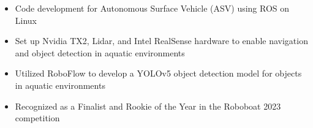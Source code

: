 \begin{itemize}
    \item Code development for Autonomous Surface Vehicle (ASV) using ROS on Linux
    \item Set up Nvidia TX2, Lidar, and Intel RealSense hardware to enable navigation and object detection in aquatic environments
    \item Utilized RoboFlow to develop a YOLOv5 object detection model for objects in aquatic environments
    \item Recognized as a Finalist and Rookie of the Year in the Roboboat 2023 competition
\end{itemize}









\divider\smallskip


